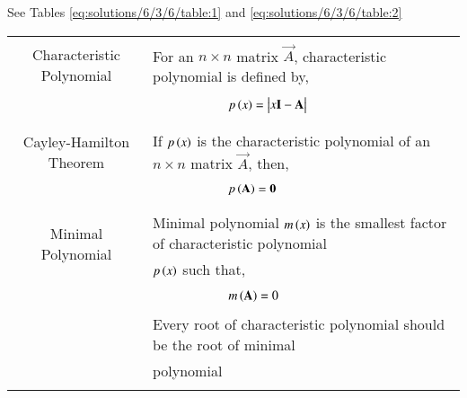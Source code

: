 See Tables \ref{eq:solutions/6/3/6/table:1} and \ref{eq:solutions/6/3/6/table:2}

\begin{table*}[ht!]
\centering
\begin{tabular}{|c|l|}
    \hline
	\multirow{3}{*}{Characteristic Polynomial} 
	& \\
	& For an $n\times n$ matrix $\vec{A}$, characteristic polynomial is defined by,\\
	&\\
	& $\qquad\qquad\qquad p\brak{x}=\mydet{x\Vec{I}-\Vec{A}}$\\
	&\\
	\hline
	\multirow{3}{*}{Cayley-Hamilton Theorem}
    &\\
    & If $p\left(x\right)$ is the characteristic polynomial of an $n\times n$ matrix $\vec{A}$, then,\\
    &\\
    &$\qquad \qquad \qquad p\left(\mathbf{A}\right)=\mathbf{0}$\\
    &\\
    \hline
	\multirow{3}{*}{Minimal Polynomial} 
	&\\
	& Minimal polynomial $m\left(x\right)$ is the smallest factor of characteristic polynomial\\
	& $p\left(x\right)$ such that,\\
	&\\
	& $\qquad \qquad \qquad m\left(\mathbf{A}\right)=0$\\
	& \\
	& Every root of characteristic polynomial should be the root of minimal\\
	& polynomial\\
	&\\
    \hline
\end{tabular}
    \caption{Definitions}
\label{eq:solutions/6/3/6/table:1}
\end{table*}

